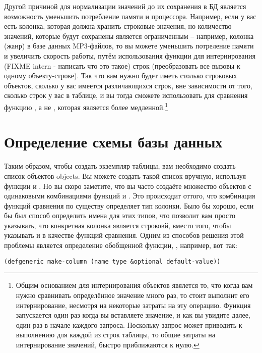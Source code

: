 Другой причиной для нормализации значений до их сохранения в БД является возможность
уменьшить потребление памяти и процессора.  Например, если у вас есть колонка, которая
должна хранить строковые значения, но количество значений, которые будут сохранены
является ограниченным -- например, колонка  (жанр) в базе данных MP3-файлов,
то вы можете уменьшить потреление памяти и увеличить скорость работы, путём использования
функции  для интернирования (FIXME intern - написать что это такое)
строк (преобразовать все вызовы  к одному объекту-строке).  Так что вам
нужно будет иметь столько строковых объектов, сколько у вас имеется различающихся строк,
вне зависимости от того, сколько строк у вас в таблице, и вы тогда сможете использовать
для сравнения функцию , а не , которая является более
медленной.\footnote{Общим основанием для интернирования объектов явялется то, что когда
  вам нужно сравнивать определённое значение много раз, то стоит выполнит его
  интернирование, несмотря на некоторые затраты на эту
  операцию. Функция запускается один раз когда вы вставляете
  значение, и как вы увидите далее, один раз в начале каждого запроса. Поскольку запрос
  может приводить к выполнению  для каждой из строк таблицы, то
  общие затраты на интернирование значений, быстро приближаются к нулю.}

\section{Определение схемы базы данных}

Таким образом, чтобы создать экземпляр таблицы, вам необходимо создать список объектов
 objects.  Вы можете создать такой список вручную, используя функции
 и .  Но вы скоро заметите, что вы часто создаёте множество
объектов  с одинаковыми комбинациями функций  и
. Это происходит оттого, что комбинация функций сравнения по
существу определяет тип колонки. Было бы хорошо, если бы был способ определить имена для
этих типов, что позволит вам просто указывать, что конкретная колонка является строковй,
вместо того, чтобы указывать  и  в качестве функций сравнения.
Одним из способов решения этой проблемы является определение обобщенной функции,
, например, вот так:

\begin{lstlisting}
(defgeneric make-column (name type &optional default-value))
\end{lstlisting}

